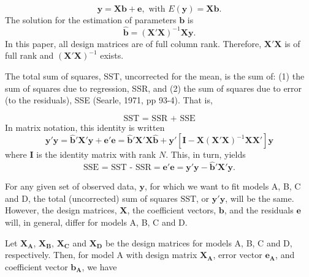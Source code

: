 \documentclass[11pt, oneside]{article}   	%
\begin{document}
\begin{equation}
\mathbf{y} = \mathbf{X}\mathbf{b} + \mathbf{e} , 
\mbox{    with       }
E(\mathbf{y}) =  \mathbf{X}\mathbf{b}. 
\end{equation} 
The solution for the estimation of parameters $\mathbf{b}$ is 
\begin{equation}
\mathbf{\hat{b}} = (\mathbf{X}'\mathbf{X})^{-1}\mathbf{X}\mathbf{y}.
\end{equation}
In this paper, all design matrices are of full column rank.  Therefore, $\mathbf{X}'\mathbf{X} $ is of full rank and $(\mathbf{X}'\mathbf{X})^{-1} $ exists.  

\bigskip

The total sum of squares, SST, uncorrected for the mean, is the sum of: (1) the sum of squares due to regression, SSR, and (2) the sum of squares due to error (to the residuals), SSE (Searle, 1971, pp 93-4).  That is, 

\begin{equation} 
\mbox{SST = SSR + SSE}
\end{equation} 
In matrix notation, this identity is written
\begin{equation}
\mathbf{y}'\mathbf{y} = \mathbf{\hat{b}}'\mathbf{X}'\mathbf{y} + \mathbf{e}'\mathbf{e} = \mathbf{\hat{b}}'\mathbf{X}'\mathbf{X}\mathbf{\hat{b}} + \mathbf{y} ' [\mathbf{I} - \mathbf{X}(\mathbf{X} ' \mathbf{X})^{-1} \mathbf{X} \mathbf{X} '] \mathbf{y}   
\end{equation} 
where $ \mathbf{I} $ is the identity matrix with rank $ N $.  This, in turn, yields
\begin{equation}
\mbox{SSE = SST - SSR} = \mathbf{e} ' \mathbf{e} = \mathbf{y} ' \mathbf{y}  - \mathbf{\hat{b}} ' \mathbf{X} ' \mathbf{y}. 
\end{equation} 

\bigskip
For any given set of observed data, $\mathbf{y}$, for which we want to fit models A, B, C and D, the total (uncorrected) sum of squares $ \mbox{SST}$, or $  \mathbf{y} ' \mathbf{y} $, will be the same.  However, the design matrices, $\mathbf{X} $, the coefficient vectors, $\mathbf{b} $, and the residuals $\mathbf{e} $ will, in general, differ for models A, B, C and D.  

\bigskip

Let $ \mathbf{X_{A}} $,  $  \mathbf{X_{B}}  $, $ \mathbf{X_{C}} $ and $ \mathbf{X_{D}} $ be the design matrices for models A, B, C and D, respectively.  Then, for  model A with design matrix $ \mathbf{X_{A}} $, error vector $ \mathbf{e_{A}} $, and coefficient vector $ \mathbf{b_{A}} $, we have 
\end{document}
